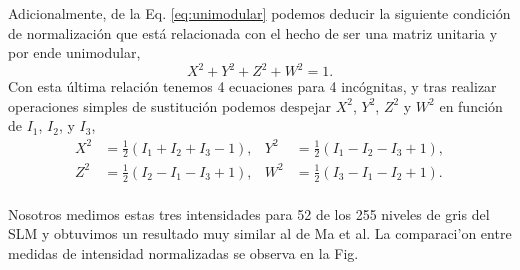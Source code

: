 Adicionalmente, de la Eq. \ref{eq:unimodular} podemos deducir la siguiente condición de
normalización que está relacionada con el hecho de ser una matriz
unitaria y por ende unimodular,
\begin{equation*}
X^2+Y^2+Z^2+W^2 =1.
\end{equation*}
Con esta última relación tenemos 4 ecuaciones para 4 incógnitas, y
tras realizar operaciones simples de sustitución podemos despejar
$X^2$, $Y^2$, $Z^2$ y $W^2$ en función de $I_1$, $I_2$, y $I_3$,
\begin{align*}
X^2 &= \frac{1}{2}\left( I_1+I_2+I_3-1\right), & Y^2 &=
                                                       \frac{1}{2}\left(
                                                       I_1-I_2-I_3+1\right),\\
Z^2 &= \frac{1}{2}\left( I_2-I_1-I_3+1\right), & W^2 &=
                                                       \frac{1}{2}\left(
                                                       I_3-I_1-I_2+1\right).\\
\end{align*}

Nosotros medimos estas tres intensidades para 52 de los 255 niveles de
gris del SLM y obtuvimos un resultado muy similar al de Ma et al. La
comparaci'on entre medidas de intensidad normalizadas se observa en la
Fig. %



